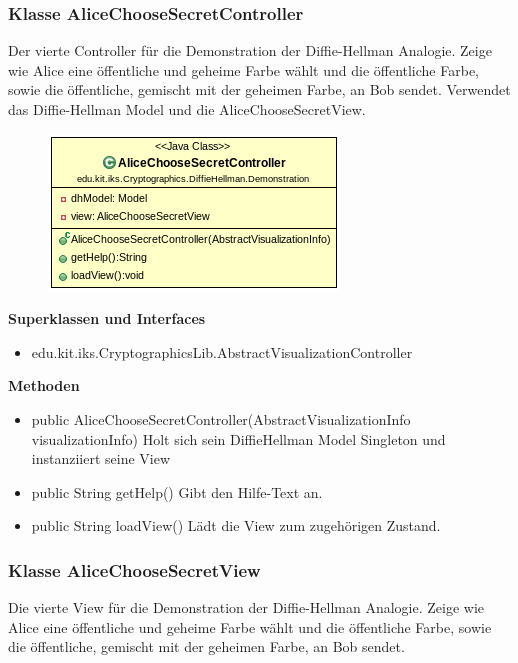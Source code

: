\documentclass{article}
\begin{document}
\subsubsection{Klasse AliceChooseSecretController}
      Der vierte Controller für die Demonstration der Diffie-Hellman Analogie.
      Zeige wie Alice eine öffentliche und geheime Farbe wählt und 
      die öffentliche Farbe, sowie die öffentliche, gemischt mit der geheimen Farbe,
      an Bob sendet.
      Verwendet das Diffie-Hellman Model und die AliceChooseSecretView.

      \begin{figure}[H]
        \centering
        \includegraphics{resources/edu-kit-iks-Cryptographics-DiffieHellman-Demonstration-AliceChooseSecretController}
      \end{figure}

      \textbf{Superklassen und Interfaces}
      \begin{itemize}
        \item edu.kit.iks.CryptographicsLib.AbstractVisualizationController
      \end{itemize}

      \textbf{Methoden}
      \begin{itemize}
          \item public AliceChooseSecretController(AbstractVisualizationInfo visualizationInfo) \newline
              Holt sich sein DiffieHellman Model Singleton und instanziiert seine View
        \item public String getHelp() \newline
        Gibt den Hilfe-Text an.
        \item public String loadView() \newline
        Lädt die View zum zugehörigen Zustand.
      \end{itemize}

\subsubsection{Klasse AliceChooseSecretView}
      Die vierte View für die Demonstration der Diffie-Hellman Analogie.
      Zeige wie Alice eine öffentliche und geheime Farbe wählt und 
      die öffentliche Farbe, sowie die öffentliche, gemischt mit der geheimen Farbe,
      an Bob sendet.
\end{document}
